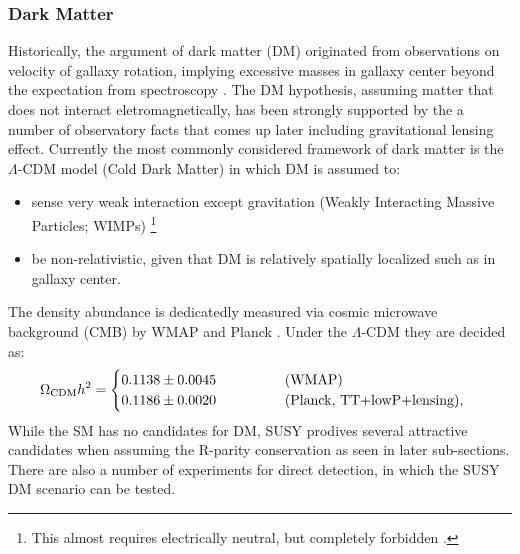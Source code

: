 \subsubsection{Dark Matter}
Historically, the argument of dark matter (DM) originated from observations on velocity of gallaxy rotation, implying excessive masses in gallaxy center beyond the expectation from spectroscopy \cite{DMGallaxyRotation1} \cite{DMGallaxyRotation2}. 
The DM hypothesis, assuming matter that does not interact eletromagnetically, has been strongly supported by the a number of observatory facts that comes up later including gravitational lensing effect. Currently the most commonly considered framework of dark matter is the $\Lambda$-CDM model (Cold Dark Matter) in which DM is assumed to:
\begin{itemize}
\item sense very weak interaction except gravitation (Weakly Interacting Massive Particles; WIMPs) 
\footnote{This almost requires electrically neutral, but completely forbidden \cite{chargedDM}.}
\item be non-relativistic, given that DM is relatively spatially localized such as in gallaxy center.
\end{itemize}
The density abundance is dedicatedly measured via cosmic microwave background (CMB) by WMAP \cite{WMAP2013} and Planck \cite{Planck2015}. Under the $\Lambda$-CDM they are decided as:
\begin{align}
\Omega_{\mathrm{CDM}} h^2 = 
\begin{cases}
  0.1138 \pm 0.0045 \mbox{\phantom{MMMMM} (WMAP)} \\
  0.1186 \pm 0.0020 \mbox{\phantom{MMMMM} (Planck, TT+lowP+lensing)},
\end{cases}
\end{align}
While the SM has no candidates for DM, SUSY prodives several attractive candidates when assuming the R-parity conservation as seen in later sub-sections. 
There are also a number of experiments for direct detection, in which the SUSY DM scenario can be tested. \\


